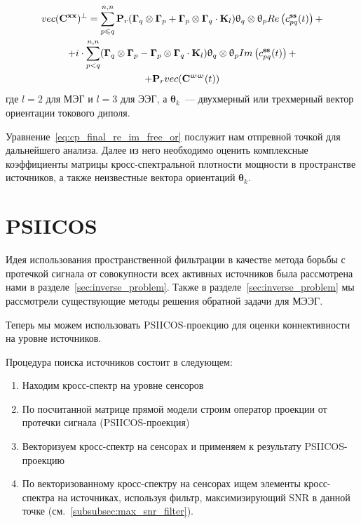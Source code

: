 \begin{multline}
    vec(\mathbf{C}^{\mathbf{x x}})^\perp = \sum\limits_{p\leqslant q}^{n,n}
    \mathbf{P}_r(\mathbf{\Gamma}_q\otimes \mathbf{\Gamma}_p +
                 \mathbf{\Gamma}_p\otimes \mathbf{\Gamma}_q\cdot \mathbf{K}_l)
                 \mathbf{\uptheta}_q \otimes \mathbf{\uptheta}_p
           Re\left(c_{pq}^{\mathbf{ss}}(t)\right) + \\
       +    i \cdot \sum\limits_{p<q}^{n,n}
           (\mathbf{\Gamma}_q\otimes \mathbf{\Gamma}_p -
            \mathbf{\Gamma}_p\otimes \mathbf{\Gamma}_q\cdot \mathbf{K}_l)
            \mathbf{\uptheta}_q \otimes \mathbf{\uptheta}_p
           Im\left(c_{pq}^{\mathbf{ss}}(t)\right) + \\
       +   \mathbf{P}_r vec(\mathbf{C}^{\mathbf{\upomega \upomega}}(t))
    \label{eq:cp_final_re_im_free_or}
\end{multline}
где $l=2$ для МЭГ и $l=3$ для ЭЭГ, а $\mathbf{\theta}_k$~--- двухмерный или трехмерный вектор ориентации токового диполя.

Уравнение~\ref{eq:cp_final_re_im_free_or} послужит нам отпревной точкой для дальнейшего анализа.
Далее из него необходимо оценить комплексные коэффициенты матрицы кросс-спектральной плотности мощности в
пространстве источников, а также неизвестные вектора ориентаций $\mathbf{\theta}_k$.
\section{PSIICOS}
Идея использования пространственной фильтрации в качестве метода борьбы с
протечкой сигнала от совокупности всех активных источников была рассмотрена
нами в разделе~\ref{sec:inverse_problem}.
Также в разделе~\ref{sec:inverse_problem} мы рассмотрели существующие методы решения
обратной задачи для МЭЭГ.

Теперь мы можем использовать PSIICOS-проекцию для оценки
коннективности на уровне источников.

Процедура поиска источников состоит в следующем:
\begin{enumerate}
    \item Находим кросс-спектр на уровне сенсоров
    \item По посчитанной матрице прямой модели строим оператор проекции от протечки сигнала (PSIICOS-проекция)
    \item Векторизуем кросс-спектр на сенсорах и применяем к результату PSIICOS-проекцию
    \item По векторизованному кросс-спектру на сенсорах ищем элементы кросс-спектра на
        источниках, используя фильтр, максимизирующий SNR в данной точке (см.~\ref{subsubsec:max_snr_filter}).
\end{enumerate}

